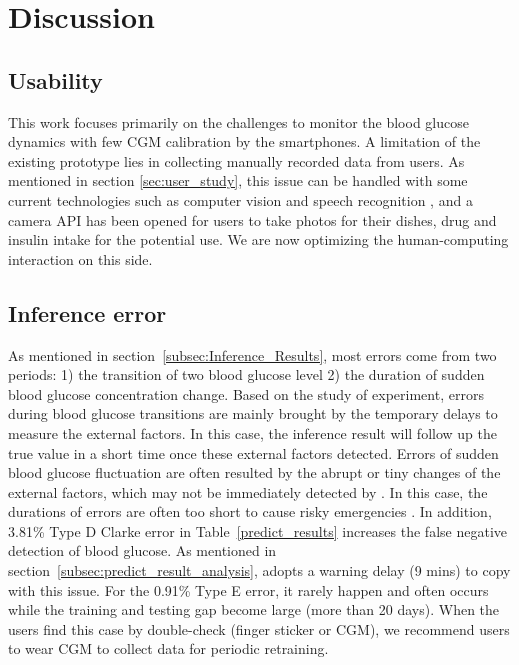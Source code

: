 \section{Discussion}
\label{sec:discussion}
\subsection{Usability}
\textcolor[rgb]{1.00,0.00,0.00}{This work focuses primarily on the challenges to monitor the blood glucose dynamics with few CGM calibration by the smartphones. A limitation of the existing prototype lies in collecting manually recorded data from users. As mentioned in section \ref{sec:user_study}, this issue can be handled with some current technologies such as computer vision \cite{bib:kawano2015foodcam}  and speech recognition \cite{bib:hinton2012deep}, and a camera API has been opened for users to take photos for their dishes, drug and insulin intake for the potential use. We are now optimizing the human-computing interaction on this side.}

\subsection{Inference error}
\textcolor[rgb]{1.00,0.00,0.00}{As mentioned in section~\ref{subsec:Inference_Results}, most errors come from two periods: 1) the transition of two blood glucose level 2) the duration of sudden blood glucose concentration change.
Based on the study of experiment, errors during blood glucose transitions are mainly brought by the temporary delays to measure the external factors. In this case, the inference result will follow up the true value in a short time once these external factors detected. Errors of sudden blood glucose fluctuation are often resulted by the abrupt or tiny changes of the external factors,
which may not be immediately detected by \sysname. In this case, the durations of errors are often too short to cause risky emergencies \cite{bib:Low_Blood_Glucose_(Hypoglycemia),bib:whitmer2009hypoglycemic}.
In addition, 3.81\% Type D Clarke error in Table~\ref{predict_results} increases the false negative detection of blood glucose. As mentioned in section~\ref{subsec:predict_result_analysis}, \sysname adopts a warning delay (9 mins) to copy with this issue. For the 0.91\% Type E error, it rarely happen and often occurs while the training and testing gap become large (more than 20 days). When the users find this case by double-check (finger sticker or CGM), we recommend users to wear CGM to collect data for periodic retraining.}


